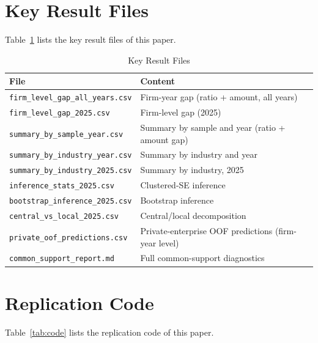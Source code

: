\documentclass[11pt,a4paper]{article}
\begin{document}
\section{Key Result Files}

Table~\ref{tab:files} lists the key result files of this paper.

\begin{table}[htbp]
\centering
\caption{Key Result Files}
\label{tab:files}
\begin{threeparttable}
\small
\begin{tabularx}{\linewidth}{l >{\raggedright\arraybackslash}X}
\toprule
File & Content \\
\midrule
\texttt{firm\_level\_gap\_all\_years.csv} & Firm-year gap (ratio + amount, all years) \\
\texttt{firm\_level\_gap\_2025.csv} & Firm-level gap (2025) \\
\texttt{summary\_by\_sample\_year.csv} & Summary by sample and year (ratio + amount gap) \\
\texttt{summary\_by\_industry\_year.csv} & Summary by industry and year \\
\texttt{summary\_by\_industry\_2025.csv} & Summary by industry, 2025 \\
\texttt{inference\_stats\_2025.csv} & Clustered-SE inference \\
\texttt{bootstrap\_inference\_2025.csv} & Bootstrap inference \\
\texttt{central\_vs\_local\_2025.csv} & Central/local decomposition \\
\texttt{private\_oof\_predictions.csv} & Private-enterprise OOF predictions (firm-year level) \\
\texttt{common\_support\_report.md} & Full common-support diagnostics \\
\bottomrule
\end{tabularx}
\end{threeparttable}
\end{table}

\section{Replication Code}

Table~\ref{tab:code} lists the replication code of this paper.
\end{document}

